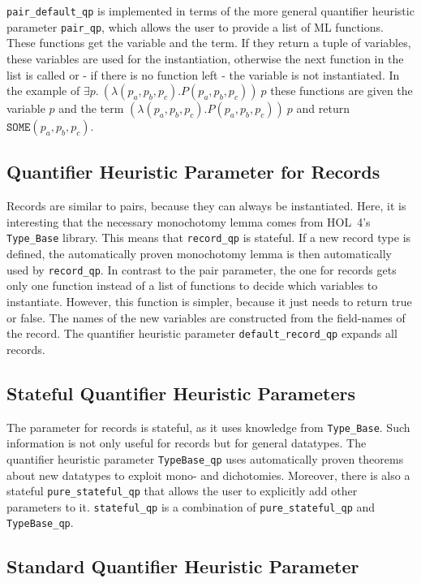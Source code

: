 \documentclass[a4paper,12pt,DIV=12,oneside]{scrbook}
\theoremstyle{definition}
\theoremstyle{remark}
\begin{document}
\texttt{pair\_default\_qp} is implemented in terms of the more general
quantifier heuristic parameter \texttt{pair\_qp}, which allows the
user to provide a list of ML functions. These functions get the
variable and the term. If they return a tuple of variables, these
variables are used for the instantiation, otherwise the next function
in the list is called or - if there is no function left - the variable
is not instantiated. In the example of $\exists p.\ (\lambda (p_a,
p_b, p_c). P(p_a, p_b, p_c))\ p$ these functions are given the
variable $p$ and the term $(\lambda (p_a, p_b, p_c). P(p_a, p_b,
p_c))\ p$ and return $\texttt{SOME} (p_a, p_b, p_c)$.

\subsection{Quantifier Heuristic Parameter for Records}

Records are similar to pairs, because they can always be instantiated. Here, it is interesting that the necessary
monochotomy lemma comes from HOL~4's \texttt{Type\_Base} library. This means that \texttt{record\_qp} is stateful.
If a new record type is defined, the automatically proven monochotomy lemma is then automatically used
by \texttt{record\_qp}. In contrast to the pair parameter, the one for records gets only one function instead of a
list of functions to decide which variables to instantiate. However, this function is simpler, because it just needs
to return true or false. The names of the new variables are constructed from the field-names of the record.
The quantifier heuristic parameter \texttt{default\_record\_qp} expands all records.

\subsection{Stateful Quantifier Heuristic Parameters}

The parameter for records is stateful, as it uses knowledge from
\texttt{Type\_Base}. Such information is not only useful for records
but for general datatypes. The quantifier heuristic parameter
\texttt{TypeBase\_qp} uses automatically proven theorems about new
datatypes to exploit mono- and dichotomies. Moreover, there is also a
stateful \texttt{pure\_stateful\_qp} that allows the user to
explicitly add other parameters to it.  \texttt{stateful\_qp} is a
combination of \texttt{pure\_stateful\_qp} and \texttt{TypeBase\_qp}.

\subsection{Standard Quantifier Heuristic Parameter}
\end{document}
